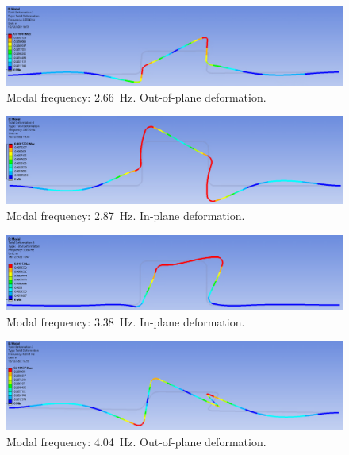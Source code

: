 \begin{figure}[H]
    \centering
    \includegraphics[width = 0.9 \textwidth]{img/fig13.png}
    \caption{Modal frequency: \SI{2.66}{\hertz}. Out-of-plane deformation.}
    \label{sim3}
\end{figure}

\begin{figure}[H]
    \centering
    \includegraphics[width = 0.9 \textwidth]{img/fig14.png}
    \caption{Modal frequency: \SI{2.87}{\hertz}. In-plane deformation.}
    \label{sim4}
\end{figure}

\begin{figure}[H]
    \centering
    \includegraphics[width = 0.9 \textwidth]{img/fig16.png}
    \caption{Modal frequency: \SI{3.38}{\hertz}. In-plane deformation.}
    \label{sim6}
\end{figure}

\begin{figure}[H]
    \centering
    \includegraphics[width = 0.9 \textwidth]{img/fig17.png}
    \caption{Modal frequency: \SI{4.04}{\hertz}. Out-of-plane deformation.}
    \label{sim7}
\end{figure}

